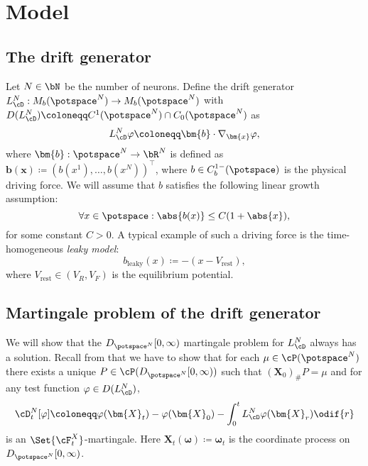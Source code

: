 \section{Model}

\subsection{The drift generator}

Let $N \in \bN$ be the number of neurons.
Define the drift generator $L_{\cD}^{N} : M_b(\potspace^N) \to M_b(\potspace^N)$ with $D(L_{\cD}^N) \coloneqq C^1(\potspace^N) \cap C_0(\potspace^N)$ as
\begin{equation}
  L_{\cD}^{N}\varphi \coloneqq \bm{b} \cdot \nabla_{\bm{x}} \varphi,
\end{equation}
where $\bm{b} : \potspace^N \to \bR^N$ is defined as $\bm{b}(\bm{x}) \coloneqq (b(x^1), \dots, b(x^N))^\top$, where $b \in C_b^{1-}(\potspace)$ is the physical driving force.
We will assume that $b$ satisfies the following linear growth assumption:
\begin{equation}
  \forall x \in \potspace : \abs{b(x)} \leq C (1 + \abs{x}),
\end{equation}
for some constant $C > 0$.
\newline
A typical example of such a driving force is the time-homogeneous \textit{leaky model}:
\begin{equation}
  b_{\mathrm{leaky}}(x) \coloneqq -(x - V_\mathrm{rest}),
\end{equation}
where $V_\mathrm{rest} \in (V_R, V_F)$ is the equilibrium potential.


\subsection{Martingale problem of the drift generator}

We will show that the $D_{\potspace^N}[0,\infty)$ martingale problem for $L_{\cD}^N$ always has a solution.
Recall from  that we have to show that for each $\mu \in \cP(\potspace^N)$ there exists a unique $P \in \cP(D_{\potspace^N}[0,\infty))$ such that $(\bm{X}_0)_\# P = \mu$ and for any test function $\varphi \in D(L_{\cD}^N)$,
\begin{equation}
  \cD_t^{N}[\varphi]
  \coloneqq \varphi(\bm{X}_t) - \varphi(\bm{X}_0) - \int_0^t L_{\cD}^{N} \varphi(\bm{X}_r) \odif{r}
\end{equation}
is an $\Set{\cF_t^X}$-martingale.
Here $\bm{X}_t(\bm{\omega}) \coloneqq \bm{\omega}_t$ is the coordinate process on $D_{\potspace^N}[0,\infty)$.

